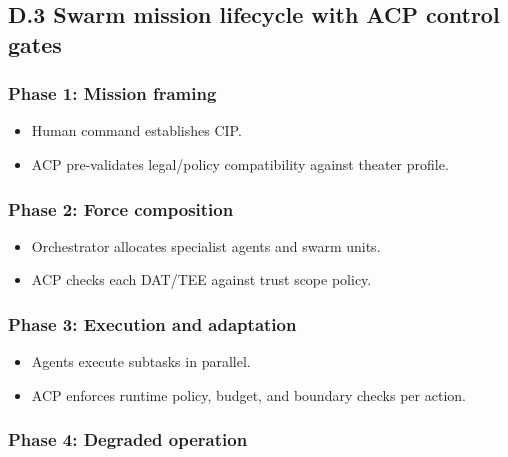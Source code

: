 \documentclass[
]{article}
\providecommand{\tightlist}{%
  \setlength{\itemsep}{0pt}\setlength{\parskip}{0pt}}
\begin{document}
\hypertarget{d.3-swarm-mission-lifecycle-with-acp-control-gates}{%
\subsection{D.3 Swarm mission lifecycle with ACP control
gates}\label{d.3-swarm-mission-lifecycle-with-acp-control-gates}}

\hypertarget{phase-1-mission-framing}{%
\subsubsection{Phase 1: Mission framing}\label{phase-1-mission-framing}}

\begin{itemize}
\tightlist
\item
  Human command establishes CIP.
\item
  ACP pre-validates legal/policy compatibility against theater profile.
\end{itemize}

\hypertarget{phase-2-force-composition}{%
\subsubsection{Phase 2: Force
composition}\label{phase-2-force-composition}}

\begin{itemize}
\tightlist
\item
  Orchestrator allocates specialist agents and swarm units.
\item
  ACP checks each DAT/TEE against trust scope policy.
\end{itemize}

\hypertarget{phase-3-execution-and-adaptation}{%
\subsubsection{Phase 3: Execution and
adaptation}\label{phase-3-execution-and-adaptation}}

\begin{itemize}
\tightlist
\item
  Agents execute subtasks in parallel.
\item
  ACP enforces runtime policy, budget, and boundary checks per action.
\end{itemize}

\hypertarget{phase-4-degraded-operation}{%
\subsubsection{Phase 4: Degraded
operation}\label{phase-4-degraded-operation}}
\end{document}
